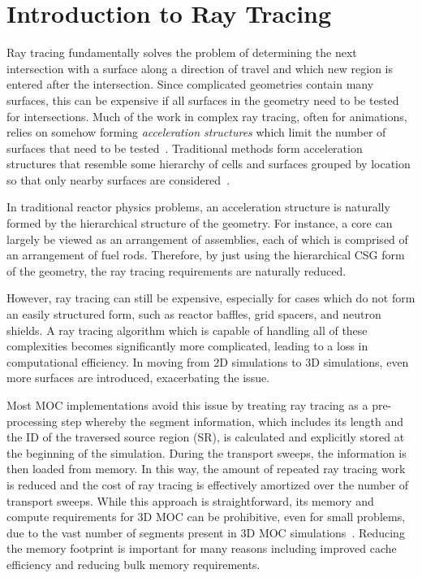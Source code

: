 \section{Introduction to Ray Tracing}
\label{sec:rt-intro}

Ray tracing fundamentally solves the problem of determining the next intersection with a surface along a direction of travel and which new region is entered after the intersection. Since complicated geometries contain many surfaces, this can be expensive if all surfaces in the geometry need to be tested for intersections. Much of the work in complex ray tracing, often for animations, relies on somehow forming \textit{acceleration structures} which limit the number of surfaces that need to be tested~\cite{acceleration-structures}. Traditional methods form acceleration structures that resemble some hierarchy of cells and surfaces grouped by location so that only nearby surfaces are considered~\cite{acc-struct-hierarchy}.

In traditional reactor physics problems, an acceleration structure is naturally formed by the hierarchical structure of the geometry. For instance, a core can largely be viewed as an arrangement of assemblies, each of which is comprised of an arrangement of fuel rods. Therefore, by just using the hierarchical \ac{CSG} form of the geometry, the ray tracing requirements are naturally reduced.

However, ray tracing can still be expensive, especially for cases which do not form an easily structured form, such as reactor baffles, grid spacers, and neutron shields. A ray tracing algorithm which is capable of handling all of these complexities becomes significantly more complicated, leading to a loss in computational efficiency. In moving from 2D simulations to 3D simulations, even more surfaces are introduced, exacerbating the issue.
	
Most \ac{MOC} implementations avoid this issue by treating ray tracing as a pre-processing step whereby the segment information, which includes its length and the ID of the traversed source region (\ac{SR}), is calculated and explicitly stored at the beginning of the simulation. During the transport sweeps, the information is then loaded from memory. In this way, the amount of repeated ray tracing work is reduced and the cost of ray tracing is effectively amortized over the number of transport sweeps. While this approach is straightforward, its memory and compute requirements for 3D \ac{MOC} can be prohibitive, even for small problems, due to the vast number of segments present in 3D \ac{MOC} simulations~\cite{physor2016otf}. Reducing the memory footprint is important for many reasons including improved cache efficiency and reducing bulk memory requirements.


